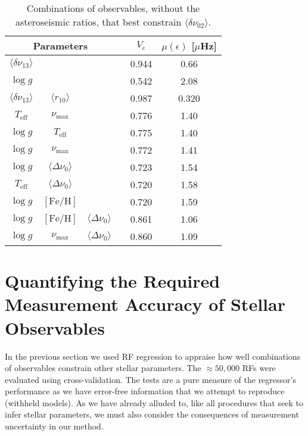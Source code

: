 \begin{table}
\centering
\caption{Combinations of observables, without the asteroseismic ratios, that best constrain $\langle\delta\nu_{02}\rangle$.}
    \begin{tabular}{cccccc}
    \hline
\multicolumn{3}{c}{Parameters} && $V_e$ & $\mu (\epsilon)$ [$\mu$Hz] \\ \hline \hline
$\langle\delta\nu_{13}\rangle$ &  &   &&0.944 & 0.66 \\ 
$\log{} g$ &  &   &&0.542 & 2.08 \\ 
$\langle\delta\nu_{13}\rangle$ &  $\langle r_{10}\rangle$  &   &&0.987 & 0.320 \\ 
$T_{\text{eff}}$     & $\nu_{\max}$&     &&0.776  & 1.40\\
$\log{} g$     &  $T_{\text{eff}}$&                 & &0.775  & 1.40\\
$\log{} g$     &$\nu_{\max}$ &               &&0.772  & 1.41\\
$\log{} g$     &$\langle\Delta\nu_0\rangle$ &               &&0.723  & 1.54\\
$T_{\text{eff}}$     & $\langle\Delta\nu_0\rangle$&     &&0.720  & 1.58\\
$\log{} g$ & $[\text{Fe/H}]$ &  && 0.720 & 1.59 \\
$\log{} g$ & $[\text{Fe/H}]$ & $\langle\Delta\nu_0\rangle$ && 0.861 & 1.06 \\
$\log{} g$ & $\nu_{\max}$ & $\langle\Delta\nu_0\rangle$ && 0.860 & 1.09 \\
\hline
    \end{tabular}
    \label{tab:d02}
\end{table}




%
\section[Quantifying the Required Measurement Accuracy]{Quantifying the Required Measurement Accuracy of Stellar Observables}
\label{sec:accu}
In the previous section we used RF regression to appraise how well combinations of observables constrain other stellar parameters. The ${\approx 50,000}$ RFs were   
evaluated using cross-validation. The tests are a pure measure of the regressor's performance as we have error-free information that we attempt to reproduce (withheld models).
 As we have already alluded to, like all procedures that seek to infer stellar parameters, we must also consider the consequences of measurement uncertainty in our method. 

